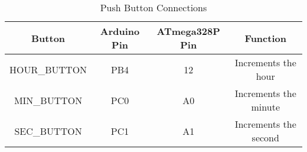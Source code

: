 \begin{table}[h]
    \centering
    \begin{tabular}{|c|c|c|c|}
        \hline
        \textbf{Button} & \textbf{Arduino Pin} & \textbf{ATmega328P Pin} & \textbf{Function} \\
        \hline
        HOUR\_BUTTON   & PB4 & 12 & Increments the hour \\
        MIN\_BUTTON    & PC0 & A0 & Increments the minute \\
        SEC\_BUTTON    & PC1 & A1 & Increments the second \\
        \hline
    \end{tabular}
    \caption{Push Button Connections}
    \label{tab:push_buttons}
\end{table}
